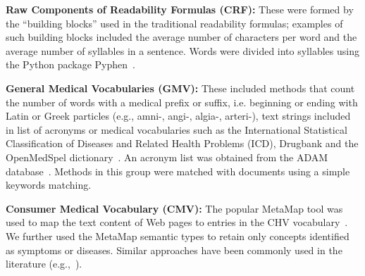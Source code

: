 
\textbf{Raw Components of Readability Formulas (CRF):}
These were formed by the ``building blocks'' used in the traditional readability formulas; examples of such building blocks included the average number of characters per word and the average number of syllables in a sentence. Words were divided into syllables using the Python package Pyphen~\cite{pyphen}.




\textbf{General Medical Vocabularies (GMV):}
These included methods that count the number of words with a medical prefix or suffix, i.e. beginning or ending with Latin or Greek particles (e.g., amni-, angi-, algia-, arteri-), text strings included in list of acronyms or medical vocabularies such as the International Statistical Classification of Diseases and Related Health Problems (ICD), Drugbank and the OpenMedSpel dictionary~\cite{openmedspel}. An acronym list was obtained from the ADAM database~\cite{zhou2006}. Methods in this group were matched with documents using a simple keywords matching.






\textbf{Consumer Medical Vocabulary (CMV):}
The popular MetaMap \cite{aronson10} tool was used to map the text content of Web pages to entries in the CHV vocabulary~\cite{zeng06}.
We further used the MetaMap semantic types to retain only concepts identified as symptoms or diseases. Similar approaches have been commonly used in the literature (e.g.,~\cite{pang16,agrafiotesA16,palotti16,yates13}).



